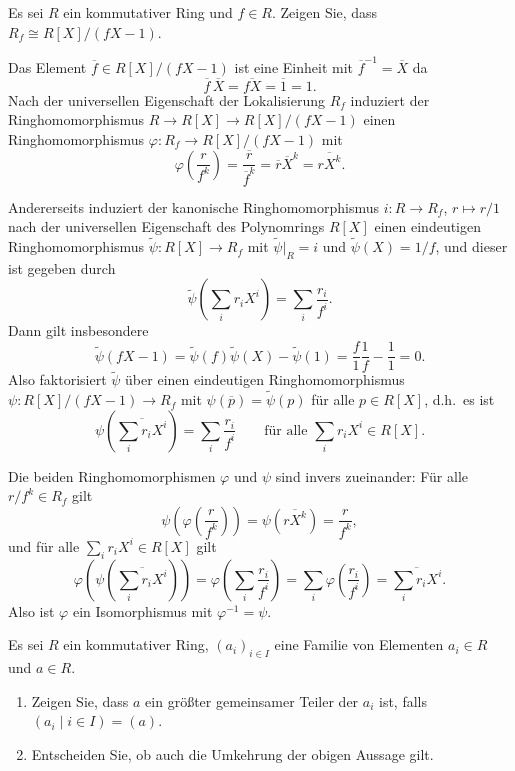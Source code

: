 \begin{question}[subtitle = Lokalisierung durch Quotienten]
  Es sei $R$ ein kommutativer Ring und $f \in R$.
  Zeigen Sie, dass $R_f \cong R[X]/(fX-1)$.
\end{question}


\begin{solution}
  Das Element $\overline{f} \in R[X]/(fX-1)$ ist eine Einheit mit $\overline{f}^{-1} = \overline{X}$ da
  \[
      \overline{f} \, \overline{X}
    = \overline{fX}
    = \overline{1}
    = 1.
  \]
  Nach der universellen Eigenschaft der Lokalisierung $R_f$ induziert der Ringhomomorphismus $R \to R[X] \to R[X]/(fX-1)$ einen Ringhomomorphismus $\varphi \colon R_f \to R[X]/(fX-1)$ mit
  \[
      \varphi\left( \frac{r}{f^k} \right)
    = \frac{\overline{r}}{\overline{f}^k}
    = \overline{r} \overline{X}^k
    = \overline{r X^k}.
  \]
  
  Andererseits induziert der kanonische Ringhomomorphismus $i \colon R \to R_f$, $r \mapsto r/1$ nach der universellen Eigenschaft des Polynomrings $R[X]$ einen eindeutigen Ringhomomorphismus $\tilde{\psi} \colon R[X] \to R_f$ mit $\tilde{\psi}|_R = i$ und $\tilde{\psi}(X) = 1/f$, und dieser ist gegeben durch
  \[
      \tilde{\psi}\left( \sum_i r_i X^i \right)
    = \sum_i \frac{r_i}{f^i}.
  \]
  Dann gilt insbesondere
  \[
      \tilde{\psi}(fX-1)
    = \tilde{\psi}(f) \tilde{\psi}(X) - \tilde{\psi}(1)
    = \frac{f}{1} \frac{1}{f} - \frac{1}{1}
    = 0.
  \]
  Also faktorisiert $\tilde{\psi}$ über einen eindeutigen Ringhomomorphismus $\psi \colon R[X]/(fX-1) \to R_f$ mit $\psi(\overline{p}) = \tilde{\psi}(p)$ für alle $p \in R[X]$, d.h.\ es ist
  \[
      \psi\left( \overline{ \sum_i r_i X^i } \right)
    = \sum_i \frac{r_i}{f^i}
    \qquad
    \text{für alle $\sum_i r_i X^i \in R[X]$}.
  \]
  
  Die beiden Ringhomomorphismen $\varphi$ und $\psi$ sind invers zueinander:
  Für alle $r/f^k \in R_f$ gilt
  \[
      \psi\left( \varphi\left( \frac{r}{f^k} \right) \right)
    = \psi\left( \overline{r X^k} \right)
    = \frac{r}{f^k},
  \]
  und für alle $\sum_i r_i X^i \in R[X]$ gilt
  \[
      \varphi\left( \psi\left( \overline{\sum_i r_i X^i} \right) \right)
    = \varphi\left( \sum_i \frac{r_i}{f^i} \right)
    = \sum_i \varphi\left( \frac{r_i}{f^i} \right)
    = \overline{\sum_i r_i X^i}.
  \]
  Also ist $\varphi$ ein Isomorphismus mit $\varphi^{-1} = \psi$.
\end{solution}


\begin{question}[subtitle = Idealtheoretische Beschreibung größter gemeinsamer Teiler]
  \label{question: greatest common divisor via generated ideal}
  Es sei $R$ ein kommutativer Ring, $(a_i)_{i \in I}$ eine Familie von Elementen $a_i \in R$ und $a \in R$.
  \begin{enumerate}
    \item
      Zeigen Sie, dass $a$ ein größter gemeinsamer Teiler der $a_i$ ist, falls $(a_i \mid i \in I) = (a)$.
    \item
      Entscheiden Sie, ob auch die Umkehrung der obigen Aussage gilt.
  \end{enumerate}
\end{question}


